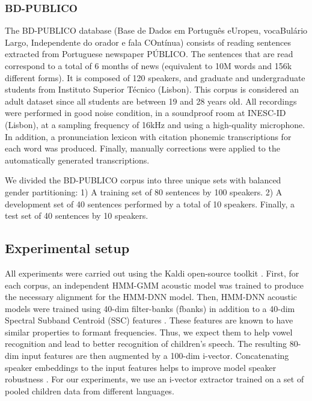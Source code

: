 \subsubsection*{BD-PUBLICO}
The BD-PUBLICO database (Base de Dados em Português eUropeu, vocaBulário Largo, Independente do orador e fala COntínua) \cite{bdpublico} consists of reading sentences extracted from Portuguese newspaper PÚBLICO. The sentences that are read correspond to a total of 6 months of news (equivalent to 10M words and 156k different forms). It is composed of 120 speakers, and graduate and undergraduate students from Instituto Superior Técnico (Lisbon). This corpus is considered an adult dataset since all students are between 19 and 28 years old. All recordings were performed in good noise condition, in a soundproof room at INESC-ID (Lisbon), at a sampling frequency of 16kHz and using a high-quality microphone. In addition, a pronunciation lexicon with citation phonemic transcriptions for each word was produced. Finally, manually corrections were applied to the automatically generated transcriptions. 

We divided the BD-PUBLICO corpus into three unique sets with balanced gender partitioning: 1) A training set of 80 sentences by 100 speakers. 2) A development set of 40 sentences performed by a total of 10 speakers. Finally, a test set of 40 sentences by 10 speakers.



\subsection{Experimental setup}
\label{section:exp_setup}

All experiments were carried out using the Kaldi open-source toolkit \cite{kaldi}. First, for each corpus, an independent HMM-GMM acoustic model was trained to produce the necessary alignment for the HMM-DNN model. Then, HMM-DNN acoustic models were trained using  40-dim filter-banks (fbanks) in addition to a 40-dim Spectral Subband Centroid (SSC) features \cite{ssc}. These features are known to have similar properties to formant frequencies. Thus, we expect them to help vowel recognition and lead to better recognition of children's speech. 
The resulting 80-dim input features are then augmented by a 100-dim i-vector. Concatenating speaker embeddings to the input features helps to improve model speaker robustness \cite{ivector}. For our experiments, we use an i-vector extractor trained on a set of pooled children data from different languages.

